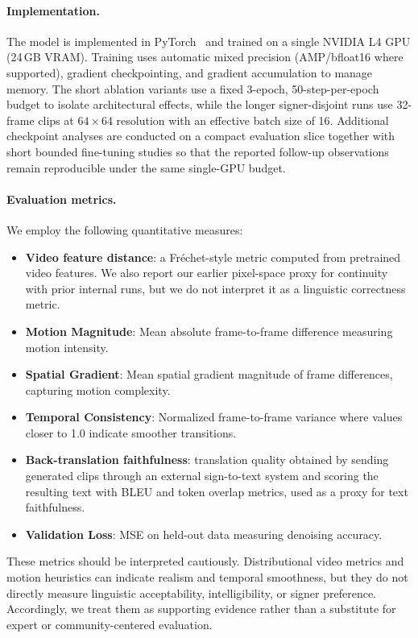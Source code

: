 \documentclass{ieeeaccess}
\begin{document}
{\color{blue}%
\paragraph{Implementation.} The model is implemented in PyTorch~\cite{paszke2019pytorch} and trained on a single NVIDIA L4 GPU (24\,GB VRAM). Training uses automatic mixed precision (AMP/bfloat16 where supported), gradient checkpointing, and gradient accumulation to manage memory. The short ablation variants use a fixed 3-epoch, 50-step-per-epoch budget to isolate architectural effects, while the longer signer-disjoint runs use 32-frame clips at $64\times64$ resolution with an effective batch size of 16. Additional checkpoint analyses are conducted on a compact evaluation slice together with short bounded fine-tuning studies so that the reported follow-up observations remain reproducible under the same single-GPU budget.

\paragraph{Evaluation metrics.} We employ the following quantitative measures:
\begin{itemize}
    \item \textbf{Video feature distance}: a Fr\'echet-style metric computed from pretrained video features. We also report our earlier pixel-space proxy for continuity with prior internal runs, but we do not interpret it as a linguistic correctness metric.
    \item \textbf{Motion Magnitude}: Mean absolute frame-to-frame difference measuring motion intensity.
    \item \textbf{Spatial Gradient}: Mean spatial gradient magnitude of frame differences, capturing motion complexity.
    \item \textbf{Temporal Consistency}: Normalized frame-to-frame variance where values closer to 1.0 indicate smoother transitions.
    \item \textbf{Back-translation faithfulness}: translation quality obtained by sending generated clips through an external sign-to-text system and scoring the resulting text with BLEU and token overlap metrics, used as a proxy for text faithfulness.
    \item \textbf{Validation Loss}: MSE on held-out data measuring denoising accuracy.
\end{itemize}

These metrics should be interpreted cautiously. Distributional video metrics and motion heuristics can indicate realism and temporal smoothness, but they do not directly measure linguistic acceptability, intelligibility, or signer preference. Accordingly, we treat them as supporting evidence rather than a substitute for expert or community-centered evaluation.
}
\end{document}
